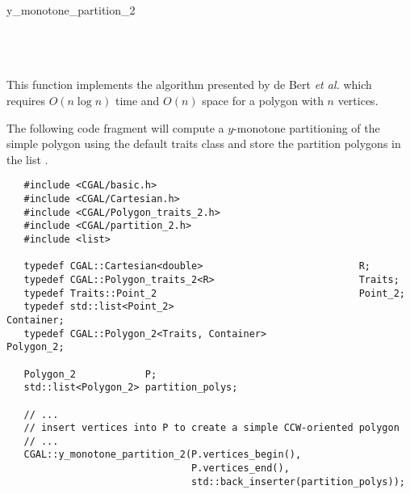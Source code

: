\begin{ccRefFunction}{y_monotone_partition_2}
\ccSeeAlso
{} \\
 \\
 \\
 \\

\ccImplementation

This function implements the algorithm presented by de Bert \textit{et al.}
\cite{bkos-cgaa-97} which requires $O(n \log n)$ time
and $O(n)$ space for a polygon with $n$ vertices.

\ccExample


The following code fragment will compute a $y$-monotone partitioning
of the simple polygon  using the default
traits class and store the partition polygons in the list 
.

\begin{verbatim}
   #include <CGAL/basic.h>
   #include <CGAL/Cartesian.h>
   #include <CGAL/Polygon_traits_2.h>
   #include <CGAL/partition_2.h>
   #include <list>

   typedef CGAL::Cartesian<double>                           R;
   typedef CGAL::Polygon_traits_2<R>                         Traits;
   typedef Traits::Point_2                                   Point_2;
   typedef std::list<Point_2>                                Container;
   typedef CGAL::Polygon_2<Traits, Container>                Polygon_2;

   Polygon_2            P;
   std::list<Polygon_2> partition_polys;

   // ...
   // insert vertices into P to create a simple CCW-oriented polygon
   // ...
   CGAL::y_monotone_partition_2(P.vertices_begin(),
                                P.vertices_end(),
                                std::back_inserter(partition_polys));
\end{verbatim}



\end{ccRefFunction}
